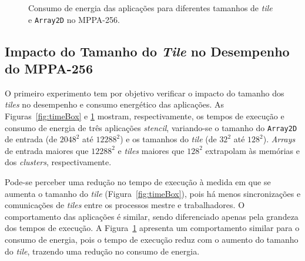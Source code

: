 \documentclass[12pt]{article}
\newcommand{\mppa}{MPPA-256\xspace}
\newcommand{\stencil}{\textit{stencil}\xspace}
\begin{document}
\begin{figure}[t]
	\centering
	\qquad
    \qquad
	\caption{Consumo de energia das aplicações para diferentes tamanhos de \textit{tile} e \texttt{Array2D} no \mppa.}
	\label{fig:energyBox}
\end{figure}

\subsection{Impacto do Tamanho do \textit{Tile} no Desempenho do \mppa}

O primeiro experimento tem por objetivo verificar o impacto do tamanho dos
\textit{tiles} no desempenho e consumo energético das aplicações. As
Figuras~\ref{fig:timeBox} e \ref{fig:energyBox} mostram, respectivamente, os
tempos de execução e consumo de energia de três aplicações \stencil, variando-se
o tamanho do \texttt{Array2D} de entrada (de $2048^2$ até $12288^2$) e os
tamanhos do \textit{tile} (de $32^2$ até $128^2$). \textit{Arrays} de entrada
maiores que $12288^2$ e \textit{tiles} maiores que $128^2$ extrapolam às
memórias \lpddr e dos \textit{clusters}, respectivamente.

Pode-se perceber uma redução no tempo de execução à medida em que se aumenta o
tamanho do \textit{tile} (Figura~\ref{fig:timeBox}), pois há menos
sincronizações e comunicações de \textit{tiles} entre os processos mestre e
trabalhadores. O comportamento das aplicações é similar, sendo diferenciado apenas
pela grandeza dos tempos de execução.
A Figura~\ref{fig:energyBox} apresenta um comportamento similar para o consumo
de energia, pois o tempo de execução reduz com o aumento do tamanho do
\textit{tile}, trazendo uma redução no consumo de energia.
\end{document}
